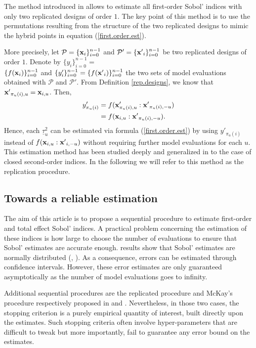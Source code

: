 The method introduced in \cite{Mara} allows to estimate all first-order Sobol' indices with only two replicated designs of order $1$. The key point of this method is to use the permutations resulting from the structure of the two replicated designs to mimic the hybrid points in equation (\ref{first.order.est}). 

More precisely, let $\mathcal{P}=\{\boldsymbol{\mathbf{x}}_i\}_{i=0}^{n-1}$ and $\mathcal{P}'=\{{\boldsymbol{\mathbf{x}}'}_i\}_{i=0}^{n-1}$ be two replicated designs of order $1$. Denote by $\{y_i\}_{i=0}^{n-1}=$\\$\{f(\boldsymbol{\mathbf{x}}_i)\}_{i=0}^{n-1}$ and $\{y'_i\}_{i=0}^{n-1}=\{f({\boldsymbol{\mathbf{x}}'}_i)\}_{i=0}^{n-1}$ the two sets of model evaluations obtained with $\mathcal{P}$ and $\mathcal{P}'$. From Definition \ref{rep.designs}, we know that ${\boldsymbol{\mathbf{x}}'}_{\pi_u(i),u}={\boldsymbol{\mathbf{x}}}_{i,u}$. Then,
\begin{align*}
y'_{\pi_u(i)}&= f(\boldsymbol{\mathbf{x}}'_{\pi_u(i),u}:{\boldsymbol{\mathbf{x}}'}_{\pi_u(i),-u}) \\
&= f(\boldsymbol{\mathbf{x}}_{i,u}:{\boldsymbol{\mathbf{x}}'}_{\pi_u(i),-u}).
\end{align*}
Hence, each $\underline{\tau}^2_u$ can be estimated via formula (\ref{first.order.est}) by using $y'_{\pi_u(i)}$ instead of $f(\boldsymbol{\mathbf{x}}_{i,u}:{\boldsymbol{\mathbf{x}}'}_{i,-u})$ without requiring further model evaluations for each $u$. This estimation method has been studied deeply and generalized in  \cite{Tissot} to the case of closed second-order indices. In the following we will refer to this method as the replication procedure.

\subsection{Towards a reliable estimation}
\label{sec:2.3}
The aim of this article is to propose a sequential procedure to estimate first-order and total effect Sobol' indices.  A practical problem concerning the estimation of these indices is how large to choose the number of evaluations to ensure that Sobol' estimates are accurate enough.  results show that Sobol' estimates are normally distributed (\cite[Proposition 2.2]{Janon}, \cite[Proposition 3.5]{Tissot}). As a consequence, errors can be estimated through confidence intervals. However, these error estimates are only guaranteed asymptotically as the number of model evaluations goes to infinity.

Additional sequential procedures are the replicated procedure and McKay's procedure respectively proposed in \cite{Gilquin.rec} and \cite{Tong}. Nevertheless, in those two cases, the stopping criterion is a purely empirical quantity of interest, built directly upon the estimates. Such stopping criteria often involve hyper-parameters that are difficult to tweak but more importantly, fail to guarantee any error bound on the estimates. 

